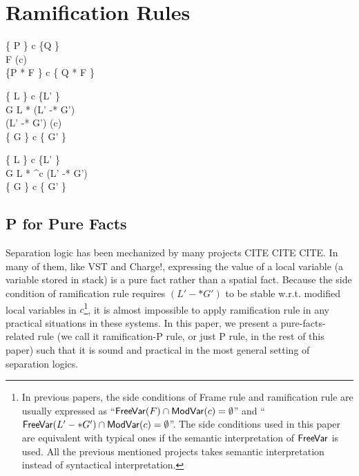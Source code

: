 \section{Ramification Rules}


{\{ P \} c \{Q \} \\
  F  \MV(c)\\}
 {\{P * F \} c \{ Q * F \}}

{\{ L \} c \{L' \} \\
 G \vdash L * (L' -* G') \\
 (L' -* G')  \MV(c)\\}
{\{ G \} c \{ G' \}}

{\{ L \} c \{L' \} \\
 G \vdash L * \Box^{\llbracket c \rrbracket} (L' -* G') \\}
{\{ G \} c \{ G' \}}

\subsection{P for Pure Facts}

Separation logic has been mechanized by many projects CITE CITE CITE.
In many of them, like VST and Charge!, expressing the value of a local
variable (a variable stored in stack) is a pure fact rather than a
spatial fact. Because the side condition of ramification rule requires $(L' -* G')$ to be stable w.r.t. modified local variables in $c$\footnote{In previous papers, the side conditions of Frame rule and ramification rule are usually expressed as ``$\mathsf{FreeVar}(F) \cap \mathsf{ModVar}(c) = \emptyset$'' and ``$\mathsf{FreeVar}(L' -* G') \cap \mathsf{ModVar}(c) = \emptyset$''. The side conditions used in this paper are equivalent with typical ones if the semantic interpretation of $\mathsf{FreeVar}$ is used. All the previous mentioned projects takes semantic interpretation instead of syntactical interpretation.}, it is almost impossible to apply ramification rule in any practical situations in these systems. In this paper, we present a pure-facts-related rule (we call it ramification-P rule, or just P rule, in the rest of this paper) such that it is sound and practical in the most general setting of separation logics.

